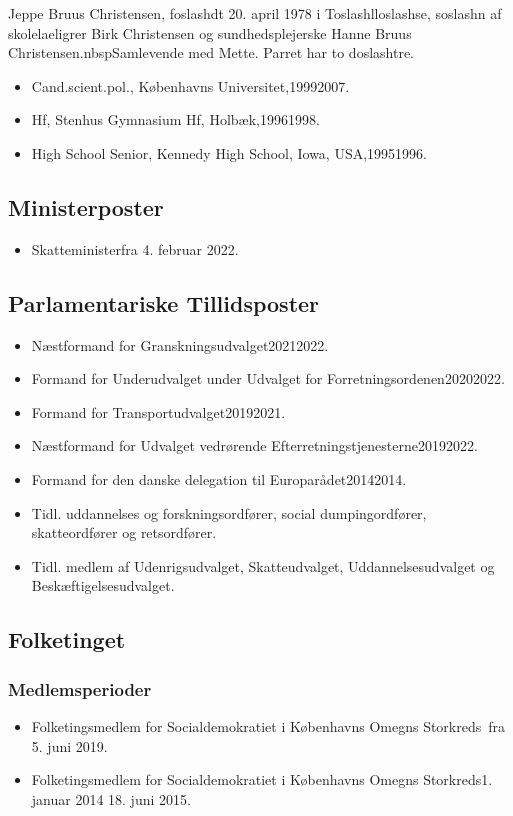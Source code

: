 \documentclass[11pt, a4paper]{awesome-cv}
\begin{document}
\makecvheader[R]
\makelettertitle
\begin{cvletter}
Jeppe Bruus Christensen, foslashdt 20. april 1978 i Toslashlloslashse, soslashn af skolelaeligrer Birk Christensen og sundhedsplejerske Hanne Bruus Christensen.nbspSamlevende med Mette. Parret har to doslashtre.

\begin{itemize}
\item Cand.scient.pol., Københavns Universitet,19992007.
\item Hf, Stenhus Gymnasium  Hf, Holbæk,19961998.
\item High School Senior, Kennedy High School, Iowa, USA,19951996.
\end{itemize}
\subsection*{Ministerposter}
\begin{itemize}
\item Skatteministerfra 4. februar 2022.
\end{itemize}
\subsection*{Parlamentariske Tillidsposter}
\begin{itemize}
\item Næstformand for Granskningsudvalget20212022.
\item Formand for Underudvalget under Udvalget for Forretningsordenen20202022.
\item Formand for Transportudvalget20192021.
\item Næstformand for Udvalget vedrørende Efterretningstjenesterne20192022.
\item Formand for den danske delegation til Europarådet20142014.
\item Tidl. uddannelses og forskningsordfører, social dumpingordfører, skatteordfører og retsordfører.
\item Tidl. medlem af Udenrigsudvalget, Skatteudvalget, Uddannelsesudvalget og Beskæftigelsesudvalget.
\end{itemize}
\subsection*{Folketinget}
\subsubsection*{Medlemsperioder}
\begin{itemize}
\item Folketingsmedlem for Socialdemokratiet i Københavns Omegns Storkreds fra 5. juni 2019.
\item Folketingsmedlem for Socialdemokratiet i Københavns Omegns Storkreds1. januar 2014  18. juni 2015.
\end{itemize}

\end{cvletter}
\end{document}
